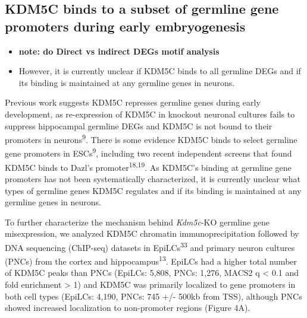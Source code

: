 \documentclass[
]{article}
\providecommand{\tightlist}{%
  \setlength{\itemsep}{0pt}\setlength{\parskip}{0pt}}
\begin{document}
\hypertarget{kdm5c-binds-to-a-subset-of-germline-gene-promoters-during-early-embryogenesis}{%
\subsection{KDM5C binds to a subset of germline gene promoters during
early
embryogenesis}\label{kdm5c-binds-to-a-subset-of-germline-gene-promoters-during-early-embryogenesis}}

\begin{itemize}
\tightlist
\item
  \textbf{note: do Direct vs indirect DEGs motif analysis}
\item
  However, it is currently unclear if KDM5C binds to all germline DEGs
  and if its binding is maintained at any germline genes in neurons.
\end{itemize}

Previous work suggests KDM5C represses germline genes during early
development, as re-expression of KDM5C in knockout neuronal cultures
fails to suppress hippocampal germline DEGs and KDM5C is not bound to
their promoters in neurons\textsuperscript{9}. There is some evidence
KDM5C binds to select germline gene promoters in
ESCs\textsuperscript{9}, including two recent independent screens that
found KDM5C binds to Dazl's promoter\textsuperscript{18,19}. As KDM5C's
binding at germline gene promoters has not been systematically
characterized, it is currently unclear what types of germline genes
KDM5C regulates and if its binding is maintained at any germline genes
in neurons.

To further characterize the mechanism behind \emph{Kdm5c}-KO germline
gene misexpression, we analyzed KDM5C chromatin immunoprecipitation
followed by DNA sequencing (ChIP-seq) datasets in
EpiLCs\textsuperscript{33} and primary neuron cultures (PNCs) from the
cortex and hippocampus\textsuperscript{13}. EpiLCs had a higher total
number of KDM5C peaks than PNCs (EpiLCs: 5,808, PNCs: 1,276, MACS2 q
\textless{} 0.1 and fold enrichment \textgreater{} 1) and KDM5C was
primarily localized to gene promoters in both cell types (EpiLCs: 4,190,
PNCs: 745 +/- 500kb from TSS), although PNCs showed increased
localization to non-promoter regions (Figure 4A).
\end{document}
